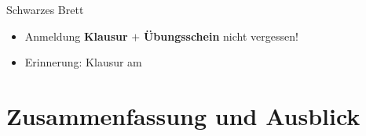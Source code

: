 


\graphicspath{{../figures/}}
\morescalingdelimiters



\begin{frame}{Schwarzes Brett}
	\begin{itemize}
		\item Anmeldung \textbf{Klausur} $+$ \textbf{Übungsschein} nicht vergessen!
		\item Erinnerung: Klausur am \Klausurtermin
	\end{itemize}
\end{frame}

\framePrevEpisode









\appendix
\beginbackup

\section{Zusammenfassung und Ausblick}

	







{}

\backupend
